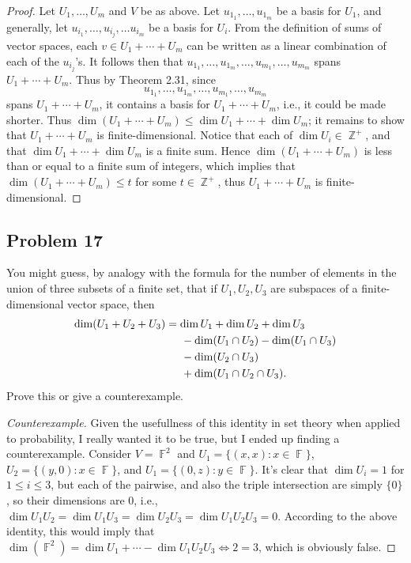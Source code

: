 \documentclass[letterpaper, 12pt]{amsart}
\DeclareMathOperator{\Z}{\mathbb{Z}}				%
\DeclareMathOperator{\F}{\mathbb{F}}				%
\theoremstyle{definition}  							%
\begin{document}
		\begin{proof}
		Let $U_{1}, \dots, U_{m}$ and $V$ be as above.
		Let $u_{1_{1}}, \dots, u_{1_{m}}$ be a basis for $U_{1}$, and generally, let $u_{i_{1}}, \dots, u_{i_{j}}, \dots u_{i_{m}}$ be a basis for $U_{i}$.
		From the definition of sums of vector spaces, each $v \in U_{1} + \cdots + U_{m}$ can be written as a linear combination of each of the $u_{i_{j}}$'s.
		It follows then that $u_{1_{1}}, \dots, u_{1_{m}}, \dots, u_{m_{1}}, \dots, u_{m_{m}}$ spans $U_{1} + \cdots + U_{m}$.
		Thus by Theorem 2.31, since $$u_{1_{1}}, \dots, u_{1_{m}}, \dots, u_{m_{1}}, \dots, u_{m_{m}}$$ spans $U_{1} + \cdots + U_{m}$, it contains a basis for $U_{1} + \cdots + U_{m}$, i.e., it could be made shorter.
		Thus $\dim(U_{1} + \cdots + U_{m}) \leq \dim U_{1} + \cdots + \dim U_{m}$; it remains to show that $U_{1} + \cdots + U_{m}$ is finite-dimensional.
		Notice that each of $\dim U_{i} \in \Z^{+}$, and that $\dim U_{1} + \cdots + \dim U_{m}$ is a finite sum.
		Hence $\dim(U_{1} + \cdots + U_{m})$ is less than or equal to a finite sum of integers, which implies that $\dim(U_{1} + \cdots + U_{m}) \leq t$ for some $t \in \Z^{+}$, thus $U_{1} + \cdots + U_{m}$ is finite-dimensional.
		\end{proof}

		\subsection*{Problem 17}
		You might guess, by analogy with the formula for the number of elements in the union of three subsets of a finite set, that if $U_{1}, U_{2}, U_{3}$ are subspaces of a finite-dimensional vector space, then 
		\begin{align*}
			\dim(U_{1} + U_{2} + U_{3}) &= \dim U_{1} + \dim U_{2} + \dim U_{3} \\
			&\hspace{5mm} - \dim(U_{1} \cap U_{2}) - \dim(U_{1} \cap U_{3}) \\
			& \hspace{5mm} - \dim(U_{2} \cap U_{3}) \\
			&\hspace{5mm} + \dim(U_{1} \cap U_{2} \cap U_{3}).
		\end{align*}
		Prove this or give a counterexample.

		\begin{proof}[Counterexample]
		Given the usefullness of this identity in set theory when applied to probability, I really wanted it to be true, but I ended up finding a counterexample.
		Consider $V = \F^{2}$ and $U_{1} = \{ (x,x) : x \in \F \}$, $U_{2} = \{ (y,0) : x \in \F \}$, and $U_{1} = \{ (0,z) : y \in \F \}$.
		It's clear that $\dim U_{i} = 1$ for $1 \leq i \leq 3$, but each of the pairwise, and also the triple intersection are simply $\{ 0 \}$, so their dimensions are $0$, i.e., $\dim U_{1}U_{2} = \dim U_{1}U_{3} = \dim U_{2}U_{3} = \dim U_{1}U_{2}U_{3} = 0$.
		According to the above identity, this would imply that $\dim(\F^{2}) = \dim U_{1} + \cdots - \dim U_{1}U_{2}U_{3} \iff  2 = 3$, which is obviously false.
		\end{proof}
\end{document}
